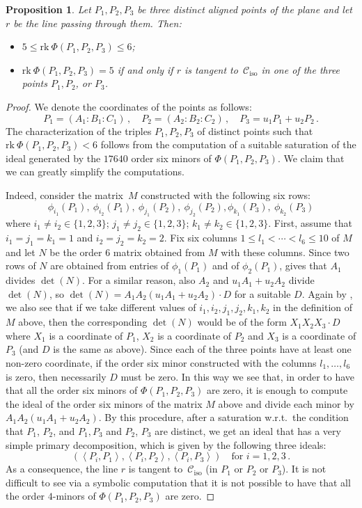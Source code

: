 \documentclass{amsart}
\theoremstyle{plain}
\newtheorem{prop}[lemma]{Proposition}
\theoremstyle{definition}
\newcommand{\iso}{\mathcal{C}_{\mathrm{iso}}}
\newcommand{\scl}[2]{\left\langle {#1}, {#2} \right\rangle}
\newcommand{\rk}{\ensuremath{\mathrm{rk}}}
\begin{document}
\begin{prop}
\label{proposition:three_aligned_ranks}
Let $P_1, P_2, P_3$ be three distinct aligned points of the plane and let
$r$ be the line passing through them. Then:
\begin{itemize}
\item $5 \leq \rk \ \Phi(P_1, P_2, P_3) \leq 6$;
\item
$\rk \ \Phi(P_1, P_2, P_3) = 5$ if and only if $r$ is tangent
to~$\iso$ in one of the three points $P_1, P_2$, or $P_3$.
\end{itemize}
\end{prop}
\begin{proof} We denote the coordinates of the points as follows:
%
\[
P_1 = (A_1: B_1: C_1) \,, \quad P_2 = (A_2: B_2: C_2) \,, \quad P_3 = u_1P_1+u_2P_2 \,.
\]
%
The characterization of the triples $P_1, P_2, P_3$ of distinct points such that $\rk \ \Phi(P_1, P_2, P_3) < 6$ follows from the computation of a suitable saturation of the ideal generated by the $17640$ order six minors of $\Phi(P_1, P_2, P_3)$.
We claim that we can greatly simplify the computations.

Indeed, consider the matrix~$M$ constructed with the following six rows:
\[
\phi_{i_1}(P_1), \ \phi_{i_2}(P_1), \ \phi_{j_1}(P_2),\  \phi_{j_2}(P_2),
\phi_{k_1}(P_3), \ \phi_{k_2}(P_3)
\]
where $i_1 \not= i_2 \in \{1, 2, 3\}$; $j_1 \not= j_2 \in \{1, 2, 3\}$;
$k_1 \not= k_2 \in \{1, 2, 3\}$.
First, assume that $i_1=j_1=k_1=1$ and
$i_2=j_2=k_2=2$. Fix six columns
$1\leq l_1 < \cdots < l_6 \leq 10$ of $M$ and let $N$ be the order $6$ matrix
obtained from $M$ with these columns. Since two rows of $N$ are obtained from
entries of $\phi_1(P_1)$ and of $\phi_2(P_1)$,
 gives that $A_1$ divides $\det(N)$. For a similar
reason, also $A_2$ and $u_1A_1+u_2A_2$ divide $\det(N)$, so
$\det(N) = A_1A_2(u_1A_1+u_2A_2)\cdot D$ for a suitable $D$.
Again by , we also see that if we take different values of
$i_1, i_2, j_1, j_2, k_1, k_2$ in the definition of $M$ above, then
the corresponding $\det(N)$ would be of the form $X_1X_2X_3\cdot D$ where
$X_1$ is a coordinate of $P_1$, $X_2$ is a coordinate of $P_2$ and $X_3$ is
a coordinate of $P_3$ (and $D$ is the same as above). Since each of the three
points have at least one non-zero coordinate, if the order six minor
constructed with the columns $l_1, \dots, l_6$ is zero, then necessarily $D$
must be zero. In this way we see that, in order to have that all the order
six minors of $\Phi(P_1, P_2, P_3)$ are zero, it is enough to compute the
ideal of the order six minors of the matrix $M$ above and divide each
minor by $A_1A_2(u_1A_1+u_2A_2)$. By this procedure, after
a saturation w.r.t.\ the condition that $P_1$, $P_2$, and $P_1, P_3$ and
$P_2$, $P_3$ are distinct, we get an ideal that has
a very simple primary decomposition, which is given by the following three
ideals:
%
\[
\left(\scl{P_i}{P_1}, \scl{P_i}{P_2},\scl{P_i}{P_3}\right) \quad
\mbox{for } i = 1, 2, 3 \,.
\]
%
As a consequence, the line $r$ is tangent to~$\iso$
(in $P_1$ or $P_2$ or $P_3$).
It is not difficult to see via a symbolic computation that it is not possible to have that all the order
$4$-minors of $\Phi(P_1, P_2, P_3)$ are zero.
\end{proof}
\end{document}
